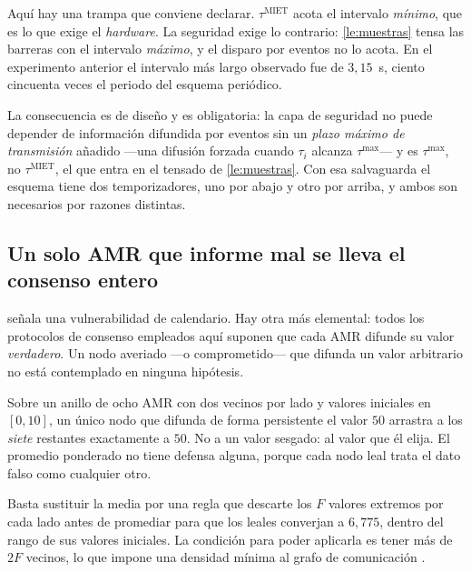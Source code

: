 \begin{observacion}
\label{obs:miet-no-acota-max}
Aquí hay una trampa que conviene declarar. $\tau^{\mathrm{MIET}}$ acota el
intervalo \emph{mínimo}, que es lo que exige el \emph{hardware}. La seguridad
exige lo contrario: \cref{le:muestras} tensa las barreras con el intervalo
\emph{máximo}, y el disparo por eventos no lo acota. En el experimento anterior
el intervalo más largo observado fue de $3{,}15$~s, ciento cincuenta veces el
periodo del esquema periódico.

La consecuencia es de diseño y es obligatoria: la capa de seguridad no puede
depender de información difundida por eventos sin un \emph{plazo máximo de
transmisión} añadido —una difusión forzada cuando $\tau_i$ alcanza
$\tau^{\max}$— y es $\tau^{\max}$, no $\tau^{\mathrm{MIET}}$, el que entra en el
tensado de \cref{le:muestras}. Con esa salvaguarda el esquema tiene dos
temporizadores, uno por abajo y otro por arriba, y ambos son necesarios por
razones distintas.
\end{observacion}

\subsection{Un solo AMR que informe mal se lleva el consenso entero}

 señala una vulnerabilidad de calendario. Hay otra
más elemental: todos los protocolos de
consenso empleados aquí suponen que cada AMR difunde su valor \emph{verdadero}.
Un nodo averiado —o comprometido— que difunda un valor arbitrario no está
contemplado en ninguna hipótesis.

\begin{observacion}
\label{obs:consenso-resiliente}
Sobre un anillo de ocho AMR con dos vecinos por lado y valores iniciales en
$[0,10]$, un único nodo que difunda de forma persistente el valor $50$ arrastra a
los \emph{siete} restantes exactamente a $50$. No a un valor sesgado: al valor
que él elija. El promedio ponderado no tiene defensa alguna, porque cada nodo
leal trata el dato falso como cualquier otro.

Basta sustituir la media por una regla que descarte los $F$ valores extremos por
cada lado antes de promediar para que los leales converjan a $6{,}775$, dentro
del rango de sus valores iniciales. La condición para poder aplicarla es tener
más de $2F$ vecinos, lo que impone una densidad mínima al grafo de comunicación
\cite{mahmoud2021advanced}.
\end{observacion}


